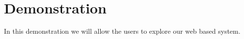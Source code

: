 \section{Demonstration}

In this demonstration we will allow the users to explore our web based system.

